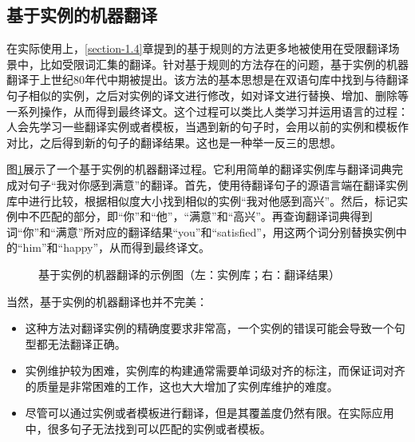 \subsection{基于实例的机器翻译}

\parinterval 在实际使用上，\ref{section-1.4}章提到的基于规则的方法更多地被使用在受限翻译场景中，比如受限词汇集的翻译。针对基于规则的方法存在的问题，基于实例的机器翻译于上世纪80年代中期被提出。该方法的基本思想是在双语句库中找到与待翻译句子相似的实例，之后对实例的译文进行修改，如对译文进行替换、增加、删除等一系列操作，从而得到最终译文。这个过程可以类比人类学习并运用语言的过程：人会先学习一些翻译实例或者模板，当遇到新的句子时，会用以前的实例和模板作对比，之后得到新的句子的翻译结果。这也是一种举一反三的思想。

\parinterval 图\ref{fig:1-14}展示了一个基于实例的机器翻译过程。它利用简单的翻译实例库与翻译词典完成对句子“我对你感到满意”的翻译。首先，使用待翻译句子的源语言端在翻译实例库中进行比较，根据相似度大小找到相似的实例“我对他感到高兴”。然后，标记实例中不匹配的部分，即“你”和“他”，“满意”和“高兴”。再查询翻译词典得到词“你”和“满意”所对应的翻译结果“you”和“satisfied”，用这两个词分别替换实例中的“him”和“happy”，从而得到最终译文。

\begin{figure}[htp]
    \centering

    \caption{基于实例的机器翻译的示例图（左：实例库；右：翻译结果）}
    \label{fig:1-14}
\end{figure}

\parinterval 当然，基于实例的机器翻译也并不完美：

\begin{itemize}
\vspace{0.5em}
\item 这种方法对翻译实例的精确度要求非常高，一个实例的错误可能会导致一个句型都无法翻译正确。
\vspace{0.5em}
\item 实例维护较为困难，实例库的构建通常需要单词级对齐的标注，而保证词对齐的质量是非常困难的工作，这也大大增加了实例库维护的难度。
\vspace{0.5em}
\item 尽管可以通过实例或者模板进行翻译，但是其覆盖度仍然有限。在实际应用中，很多句子无法找到可以匹配的实例或者模板。
\vspace{0.5em}
\end{itemize}

